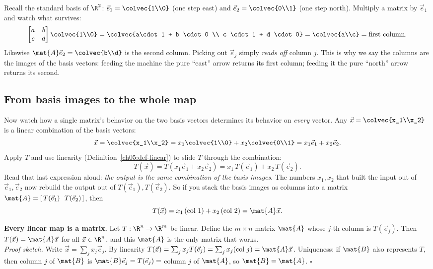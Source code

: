 Recall the standard basis of $\R^2$: $\vec{e}_1 = \colvec{1\\0}$ (one step east)
and $\vec{e}_2 = \colvec{0\\1}$ (one step north). Multiply a matrix by
$\vec{e}_1$ and watch what survives:
\[
  \begin{bmatrix} a & b \\ c & d \end{bmatrix}\colvec{1\\0}
  = \colvec{a\cdot 1 + b \cdot 0 \\ c \cdot 1 + d \cdot 0}
  = \colvec{a\\c} = \text{first column.}
\]
Likewise $\mat{A}\vec{e}_2 = \colvec{b\\d}$ is the second column. Picking out
$\vec{e}_j$ simply \emph{reads off} column $j$. This is why we say the columns
are the images of the basis vectors: feeding the machine the pure ``east'' arrow
returns its first column; feeding it the pure ``north'' arrow returns its second.

\subsection{From basis images to the whole map}

Now watch how a single matrix's behavior on the two basis vectors determines its
behavior on \emph{every} vector. Any $\vec{x} = \colvec{x_1\\x_2}$ is a linear
combination of the basis vectors:
\[
  \vec{x} = \colvec{x_1\\x_2} = x_1\colvec{1\\0} + x_2\colvec{0\\1}
          = x_1\vec{e}_1 + x_2\vec{e}_2.
\]
Apply $T$ and use linearity (Definition~\ref{ch05:def-linear}) to slide $T$
through the combination:
\[
  T(\vec{x}) = T(x_1\vec{e}_1 + x_2\vec{e}_2)
             = x_1\,T(\vec{e}_1) + x_2\,T(\vec{e}_2).
\]
Read that last expression aloud: \emph{the output is the same combination of the
basis images}. The numbers $x_1, x_2$ that built the input out of $\vec{e}_1,
\vec{e}_2$ now rebuild the output out of $T(\vec{e}_1), T(\vec{e}_2)$. So if you
stack the basis images as columns into a matrix $\mat{A} =
[\,T(\vec{e}_1)\ \ T(\vec{e}_2)\,]$, then
\[
  T(\vec{x}) = x_1\,(\text{col }1) + x_2\,(\text{col }2) = \mat{A}\vec{x}.
\]

\begin{formalbox}
\textbf{Every linear map is a matrix.} Let $T : \R^n \to \R^m$ be linear. Define
the $m \times n$ matrix $\mat{A}$ whose $j$-th column is $T(\vec{e}_j)$. Then
$T(\vec{x}) = \mat{A}\vec{x}$ for all $\vec{x} \in \R^n$, and this $\mat{A}$ is the
only matrix that works. \\[0.3em]
\emph{Proof sketch.} Write $\vec{x} = \sum_j x_j \vec{e}_j$. By linearity
$T(\vec{x}) = \sum_j x_j T(\vec{e}_j) = \sum_j x_j (\text{col } j) = \mat{A}\vec{x}$.
Uniqueness: if $\mat{B}$ also represents $T$, then column $j$ of $\mat{B}$ is
$\mat{B}\vec{e}_j = T(\vec{e}_j) = $ column $j$ of $\mat{A}$, so $\mat{B}=\mat{A}$.
\hfill$\square$
\end{formalbox}

